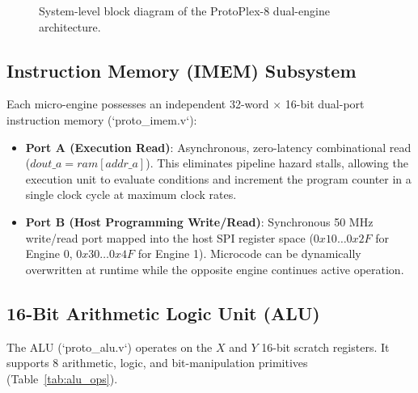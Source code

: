 \documentclass[11pt,a4paper]{article}
\begin{document}
\begin{figure}[htbp]
\caption{System-level block diagram of the ProtoPlex-8 dual-engine architecture.}
\label{fig:top_architecture}
\end{figure}

\subsection{Instruction Memory (IMEM) Subsystem}
Each micro-engine possesses an independent 32-word $\times$ 16-bit dual-port instruction memory (`proto\_imem.v`):
\begin{itemize}
    \item \textbf{Port A (Execution Read)}: Asynchronous, zero-latency combinational read ($dout\_a = ram[addr\_a]$). This eliminates pipeline hazard stalls, allowing the execution unit to evaluate conditions and increment the program counter in a single clock cycle at maximum clock rates.
    \item \textbf{Port B (Host Programming Write/Read)}: Synchronous 50 MHz write/read port mapped into the host SPI register space ($0x10 \dots 0x2F$ for Engine 0, $0x30 \dots 0x4F$ for Engine 1). Microcode can be dynamically overwritten at runtime while the opposite engine continues active operation.
\end{itemize}

\subsection{16-Bit Arithmetic Logic Unit (ALU)}
The ALU (`proto\_alu.v`) operates on the $X$ and $Y$ 16-bit scratch registers. It supports 8 arithmetic, logic, and bit-manipulation primitives (Table~\ref{tab:alu_ops}).
\end{document}
